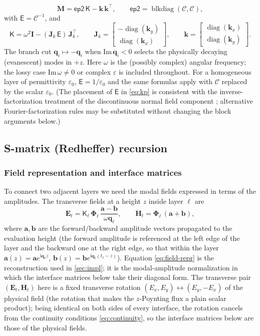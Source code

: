\documentclass[11pt]{article}
\theoremstyle{remark}
\newcommand{\eps}{\varepsilon}
\newcommand{\Cmat}{\mathcal{C}}
\newcommand{\kp}{\mathsf{K}}
\newcommand{\epinv}{\mathsf{E}}
\newcommand{\Jk}{\mathbf{J}_k}
\newcommand{\kk}{\mathbf{k}}
\newcommand{\Ph}{\mathbf{\Phi}}
\newcommand{\fq}{\mathbf{q}}
\newcommand{\fa}{\mathbf{a}}
\newcommand{\fb}{\mathbf{b}}
\newcommand{\Id}{\mathbf{I}}
\DeclareMathOperator{\diag}{diag}
\DeclareMathOperator{\blkdiag}{blkdiag}
\newcommand{\ii}{\mathrm{i}}
\begin{document}
\begin{equation}
\mathbf{M}=\mathsf{ep2}\,\kp-\kk\,\kk^{\top},\qquad
\mathsf{ep2}=\blkdiag(\Cmat,\Cmat),
\label{eq:M}
\end{equation}
with $\epinv=\Cmat^{-1}$, and
\begin{equation}
\kp=\omega^2\Id-(\Jk\,\epinv)\,\Jk^{\top},\qquad
\Jk=\begin{bmatrix}-\diag(\kk_y)\\ \diag(\kk_x)\end{bmatrix},
\qquad
\kk=\begin{bmatrix}\diag(\kk_x)\\ \diag(\kk_y)\end{bmatrix}.
\label{eq:kp}
\end{equation}
The branch cut $\fq_i\mapsto-\fq_i$ when $\mathrm{Im}\,\fq_i<0$ selects the
physically decaying (evanescent) modes in $+z$. Here $\omega$ is the (possibly
complex) angular frequency; the lossy case $\mathrm{Im}\,\omega\neq0$ or
complex $\eps$ is included throughout. For a homogeneous layer of permittivity
$\eps_0$, $\epinv=1/\eps_0$ and the same formulas apply with $\Cmat$ replaced
by the scalar $\eps_0$. (The placement of $\epinv$ in \eqref{eq:kp}
is consistent with the inverse-factorization treatment of the discontinuous
normal field component \cite{li1996fourier}; alternative Fourier-factorization
rules may be substituted without changing the block arguments below.)

\subsection{S-matrix (Redheffer) recursion}

\subsubsection{Field representation and interface matrices}

To connect two adjacent layers we need the modal fields expressed in terms of
the amplitudes.  The transverse fields at a height $z$ inside layer $\ell$ are
\begin{equation}
\mathbf{E}_t=\kp_\ell\,\Ph_\ell\,\frac{\fa-\fb}{\omega\fq_\ell},\qquad
\mathbf{H}_t=\Ph_\ell\,(\fa+\fb),
\label{eq:field-repr}
\end{equation}
where $\fa,\fb$ are the forward/backward amplitude vectors propagated to the
evaluation height (the forward amplitude is referenced at the left edge of the
layer and the backward one at the right edge, so that within the layer
$\fa(z)=\fa e^{\ii\fq_\ell z}$, $\fb(z)=\fb e^{\ii\fq_\ell(t_\ell-z)}$).
Equation \eqref{eq:field-repr} is the reconstruction used in
\cref{sec:impl}; it is the modal-amplitude normalization in which the
interface matrices below take their diagonal form.  The transverse pair
$(\mathbf{E}_t,\mathbf{H}_t)$ here is a fixed transverse rotation
$(E_x,E_y)\leftrightarrow(E_y,-E_x)$ of the physical field (the rotation that
makes the $z$-Poynting flux a plain scalar product); being identical on both
sides of every interface, the rotation cancels from the continuity conditions
\eqref{eq:continuity}, so the interface matrices below are those of the
physical fields.
\end{document}
